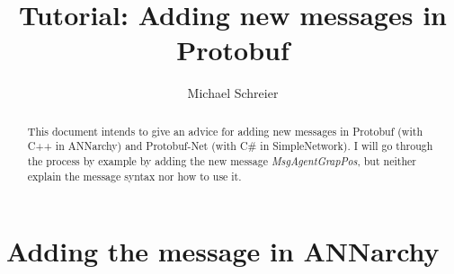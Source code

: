 \documentclass[a4paper,11pt,oneside,pdftex]{scrartcl}
\begin{document}
 \title{Tutorial: Adding new messages in Protobuf}
 \date{}
\author{Michael Schreier}
\maketitle
\begin{abstract}
 This document intends to give an advice for adding new messages in Protobuf (with C++ in ANNarchy) and Protobuf-Net (with C\# in SimpleNetwork).
 I will go through the process by example by adding the new message \emph{MsgAgentGrapPos}, but neither explain the message syntax nor how to use it. 
\end{abstract}


\section{Adding the message in ANNarchy}
\end{document}
